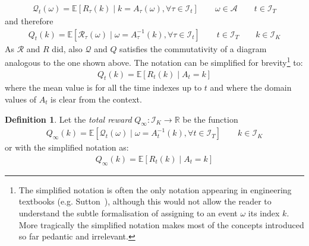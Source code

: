\documentclass[]{scrartcl}
\theoremstyle{definition}
\newtheorem{definition}{Definition}[section]
\begin{document}
\begin{align}\label{def:mathcalQt}
\mathcal{Q}_t(\omega) = \mathbb{E} \left[ R_{\tau}(k)\mid k = A_{\tau}(\omega), \forall \tau \in \mathcal{I}_t \right]
\qquad 
\omega \in \mathcal{A}
\qquad
t \in \mathcal{I}_T
\end{align}
and therefore
\begin{align}\label{def:Qt}
Q_t(k) = \mathbb{E} \left[ \mathcal{R}_{\tau}(\omega)\mid \omega = A_{\tau}^{-1}(k), \forall \tau \in \mathcal{I}_t \right]
\qquad
t \in \mathcal{I}_T
\qquad
k \in \mathcal{I}_K
\end{align}
As $\mathcal{R}$ and $R$ did, also $\mathcal{Q}$ and $Q$ satisfies the commutativity of a diagram analogous to the one shown above. The notation can be simplified for brevity\footnote{
    The simplified notation is often the only notation appearing in engineering textbooks (e.g. Sutton~\cite{sutton2018reinforcement}), although this would not allow the reader to understand the subtle formalisation of assigning to an event $\omega$ its index $k$. More tragically the simplified notation makes most of the concepts introduced so far pedantic and irrelevant.
} to:
\begin{align}\label{def:mathcalQt_simple}
Q_t(k) = \mathbb{E} \left[ R_{t}(k) \mid A_{t} = k \right]
\end{align}
where the mean value is for all the time indexes up to $t$ and where the domain values of $A_t$ is clear from the context. 

\begin{definition}
    Let the \emph{total reward} $Q_{\infty}: \mathcal{I}_K \rightarrow \mathbb{R}$ be the function
    \begin{align}\label{def:mathcalQinf}
    Q_{\infty}(k) = \mathbb{E} \left[ \mathcal{Q}_{t}(\omega) \mid \omega = A^{-1}_{t}(k), \forall t \in \mathcal{I}_T \right]
    \qquad
    k \in \mathcal{I}_K 
    \end{align}
    or with the simplified notation as:
    \begin{align}\label{def:mathcalQinf_simple}
    Q_{\infty}(k) = \mathbb{E} \left[ R_{t}(k) \mid A_{t} = k \right]
    \end{align}
\end{definition}
\end{document}
